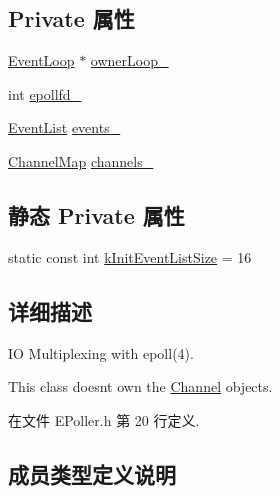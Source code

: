 \subsection*{Private 属性}
\begin{DoxyCompactItemize}
\item 
\hyperlink{classmuduo_1_1EventLoop}{Event\+Loop} $\ast$ \hyperlink{classmuduo_1_1EPoller_ab7cf856df3fd0f8496fcf3b59b8a24ab}{owner\+Loop\+\_\+}
\item 
int \hyperlink{classmuduo_1_1EPoller_a942c2940f17cc0c7cbd918424bd6f263}{epollfd\+\_\+}
\item 
\hyperlink{classmuduo_1_1EPoller_ac074005c5f2127640fb6a6e22aa58bae}{Event\+List} \hyperlink{classmuduo_1_1EPoller_a230adbff354741cf0b5d4af33c4fb2e3}{events\+\_\+}
\item 
\hyperlink{classmuduo_1_1EPoller_a950db725d18ce33d8457ae784380a07e}{Channel\+Map} \hyperlink{classmuduo_1_1EPoller_aca6f39ba1cb9dbdd28edf2291d1b4fd5}{channels\+\_\+}
\end{DoxyCompactItemize}
\subsection*{静态 Private 属性}
\begin{DoxyCompactItemize}
\item 
static const int \hyperlink{classmuduo_1_1EPoller_a926125e406052891f69477342de6275f}{k\+Init\+Event\+List\+Size} = 16
\end{DoxyCompactItemize}


\subsection{详细描述}
IO Multiplexing with epoll(4).

This class doesn\textquotesingle{}t own the \hyperlink{classmuduo_1_1Channel}{Channel} objects. 

在文件 E\+Poller.\+h 第 20 行定义.



\subsection{成员类型定义说明}
\mbox{\label{classmuduo_1_1EPoller_a0b74248ffee6df294563618187b52404}} 
